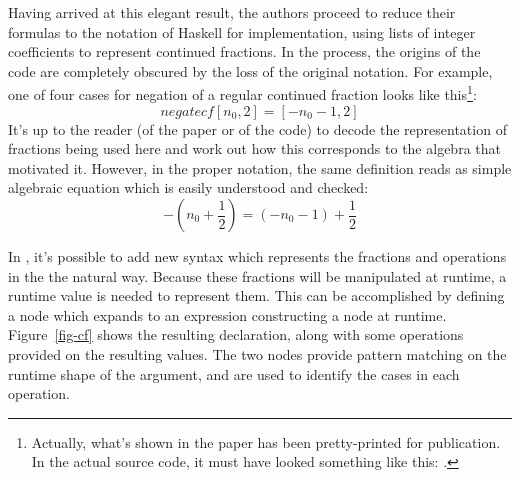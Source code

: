 Having arrived at this elegant result, the authors proceed to reduce their formulas to the notation of Haskell for implementation, using lists of integer coefficients to represent continued fractions. In the process, the origins of the code are completely obscured by the loss of the original notation. For example, one of four cases for negation of a regular continued fraction looks like this\footnote{Actually, what's shown in the paper has been pretty-printed for publication\cite{lhs2tex}. In the actual source code, it must have looked something like this: .}:
$$\mathit{negatecf} [n_0, 2] = [-n_0-1, 2]$$
It's up to the reader (of the paper or of the code) to decode the representation of fractions being used here and work out how this corresponds to the algebra that motivated it. However, in the proper notation, the same definition reads as simple algebraic equation which is easily understood and checked:
$$-\left(n_0 + \frac{1}{2}\right) = (-n_0 - 1) + \frac{1}{2}$$

In \Meta, it's possible to add new syntax which represents the fractions and operations in the the natural way. Because these fractions will be manipulated at runtime, a runtime value is needed to represent them. This can be accomplished by defining a  node which expands to an expression constructing a node at runtime. Figure~\ref{fig-cf} shows the resulting declaration, along with some operations provided on the resulting values. The two  nodes provide pattern matching on the runtime shape of the argument, and are used to identify the cases in each operation.

